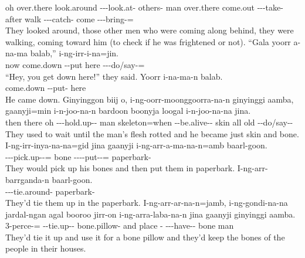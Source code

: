 \begin{exye}
oh over.there look.around ---look.at- others- man over.there come.out ---take- after walk ---catch- come ---bring-=\\
\ft They looked around, those other men who were coming along behind, they were walking, coming toward him (to check if he was frightened or not).
\exy {}
\gll ``Gala yoorr a-na-ma balab,'' i-ng-irr-i-na=jin.\\
now come.down --put here ---do/say-=\\
\ft ``Hey, you get down here!'' they said.
\exy {}
\gll Yoorr i-na-ma-n balab.\\
come.down --put- here\\
\ft He came down.
\exy {}
\gll Ginyinggon biij o, i-ng-oorr-moonggoorra-na-n ginyinggi aamba, gaanyji=min i-n-joo-na-n bardoon boonyja loogal i-n-joo-na-na jina.\\
then there oh ---hold.up--  man skeleton=when --be.alive-- skin all old --do/say-- \\
\ft They used to wait until the man's flesh rotted and he became just skin and bone.
\exy {}
\gll I-ng-irr-inya-na-na=gid jina gaanyji i-ng-arr-a-ma-na-n=amb baarl-goon.\\
---pick.up--=  bone ----put--= paperbark-\\
\ft They would pick up his bones and then put them in paperbark.
\exy {}
\gll I-ng-arr-barrganda-n baarl-goon.\\
---tie.around- paperbark-\\
\ft They'd tie them up in the paperbark.
\newpage\exy {}
\gll I-ng-arr-ar-na-n=jamb, i-ng-gondi-na-na jardal-ngan agal booroo jirr-on i-ng-arra-laba-na-n jina gaanyji ginyinggi aamba.\\
3-perce-= --tie.up-- bone.pillow- and place - ---have--  bone  man\\
\ft They'd tie it up and use it for a bone pillow and they'd keep the bones of the people in their houses.
\end{exye}

